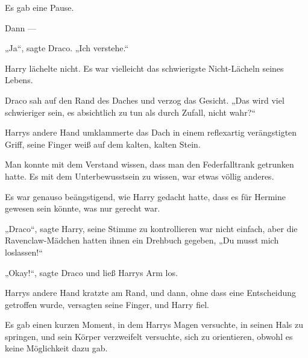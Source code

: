 Es gab eine Pause.

Dann —

„Ja“, sagte Draco.
„Ich verstehe.“

Harry lächelte nicht. Es war vielleicht das schwierigste Nicht-Lächeln seines Lebens.

Draco sah auf den Rand des Daches und verzog das Gesicht.
„Das wird viel schwieriger sein, es absichtlich zu tun als durch Zufall, nicht wahr?“

\later

Harrys andere Hand umklammerte das Dach in einem reflexartig verängstigten Griff, seine Finger weiß auf dem kalten, kalten Stein.

Man konnte mit dem Verstand wissen, dass man den Federfalltrank getrunken hatte. Es mit dem Unterbewusstsein zu wissen, war etwas völlig anderes.

Es war genauso beängstigend, wie Harry gedacht hatte, dass es für Hermine gewesen sein könnte, was nur gerecht war.

„Draco“, sagte Harry, seine Stimme zu kontrollieren war nicht einfach, aber die Ravenclaw-Mädchen hatten ihnen ein Drehbuch gegeben,
„Du musst mich loslassen!“

„Okay!“, sagte Draco und ließ Harrys Arm los.

Harrys andere Hand kratzte am Rand, und dann, ohne dass eine Entscheidung getroffen wurde, versagten seine Finger, und Harry fiel.

Es gab einen kurzen Moment, in dem Harrys Magen versuchte, in seinen Hals zu springen, und sein Körper verzweifelt versuchte, sich zu orientieren, obwohl es keine Möglichkeit dazu gab.

